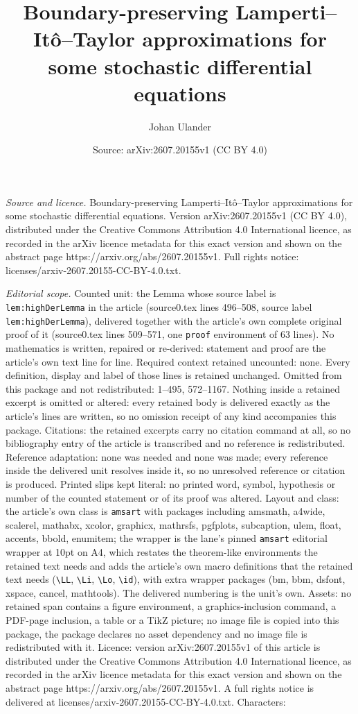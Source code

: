 \documentclass[10pt,a4paper]{amsart}
\title[Boundary-preserving Lamperti--It\^o--Taylor approximations f]{Boundary-preserving Lamperti--It\^o--Taylor approximations for some stochastic differential equations}
\author{Johan Ulander}
\date{Source: arXiv:2607.20155v1 (CC BY 4.0)}
\begin{document}
\maketitle

\noindent\emph{Source and licence.} Boundary-preserving Lamperti--It\^o--Taylor approximations for some stochastic differential equations. Version arXiv:2607.20155v1 (CC BY 4.0), distributed under the Creative Commons Attribution 4.0 International licence, as recorded in the arXiv licence metadata for this exact version and shown on the abstract page https://arxiv.org/abs/2607.20155v1. Full rights notice: licenses/arxiv-2607.20155-CC-BY-4.0.txt.\par\smallskip

\noindent\textit{Editorial scope.} Counted unit: the Lemma whose source label is \texttt{lem:highDerLemma} in the article (source0.tex lines 496--508, source label \texttt{lem:highDerLemma}), delivered together with the article's own complete original proof of it (source0.tex lines 509--571, one \texttt{proof} environment of 63 lines). No mathematics is written, repaired or re-derived: statement and proof are the article's own text line for line. Required context retained uncounted: none. Every definition, display and label of those lines is retained unchanged. Omitted from this package and not redistributed: 1--495, 572--1167. Nothing inside a retained excerpt is omitted or altered: every retained body is delivered exactly as the article's lines are written, so no omission receipt of any kind accompanies this package. Citations: the retained excerpts carry no citation command at all, so no bibliography entry of the article is transcribed and no reference is redistributed. Reference adaptation: none was needed and none was made; every reference inside the delivered unit resolves inside it, so no unresolved reference or citation is produced. Printed slips kept literal: no printed word, symbol, hypothesis or number of the counted statement or of its proof was altered. Layout and class: the article's own class is \texttt{amsart} with packages including amsmath, a4wide, scalerel, mathabx, xcolor, graphicx, mathrsfs, pgfplots, subcaption, ulem, float, accents, bbold, enumitem; the wrapper is the lane's pinned \texttt{amsart} editorial wrapper at 10pt on A4, which restates the theorem-like environments the retained text needs and adds the article's own macro definitions that the retained text needs (\texttt{\textbackslash LL}, \texttt{\textbackslash Li}, \texttt{\textbackslash Lo}, \texttt{\textbackslash id}), with extra wrapper packages (bm, bbm, dsfont, xspace, cancel, mathtools). The delivered numbering is the unit's own. Assets: no retained span contains a figure environment, a graphics-inclusion command, a PDF-page inclusion, a table or a TikZ picture; no image file is copied into this package, the package declares no asset dependency and no image file is redistributed with it. Licence: version arXiv:2607.20155v1 of this article is distributed under the Creative Commons Attribution 4.0 International licence, as recorded in the arXiv licence metadata for this exact version and shown on the abstract page https://arxiv.org/abs/2607.20155v1. A full rights notice is delivered at licenses/arxiv-2607.20155-CC-BY-4.0.txt. Characters: 
\end{document}
